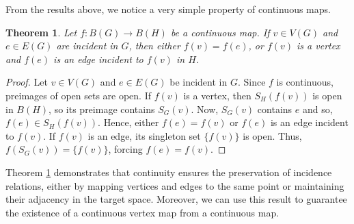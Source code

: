 \documentclass{amsart}
\newtheorem{theorem}{Theorem}[section]
\theoremstyle{definition}
\theoremstyle{remark}
\numberwithin{equation}{section}
\begin{document}
	From the results above, we notice a very simple property of continuous maps.
	
	\begin{theorem}
		\label{ContinuityPreservesIncidence}
		Let \(f:B(G) \rightarrow B(H)\) be a continuous map. If \(v \in V(G)\) and \(e \in E(G)\) are incident in \(G\), then either \(f(v) = f(e)\), or \(f(v)\) is a vertex and \(f(e)\) is an edge incident to \(f(v)\) in \(H\).
	\end{theorem}
	\begin{proof}
		Let \( v \in V(G) \) and \( e \in E(G) \) be incident in \( G \). Since \( f \) is continuous, preimages of open sets are open. If \( f(v) \) is a vertex, then \( S_H(f(v)) \) is open in \(B(H)\), so its preimage contains \(S_G(v)\). Now, \(S_G(v)\) contains \( e \) and so, \( f(e) \in S_H(f(v)) \). Hence, either \( f(e) = f(v) \) or \( f(e) \) is an edge incident to \( f(v) \). If \( f(v) \) is an edge, its singleton set \(\{f(v)\}\) is open. Thus, \(f(S_G(v)) = \{f(v)\}\), forcing \( f(e) = f(v) \).
	\end{proof}
	
	Theorem \ref{ContinuityPreservesIncidence} demonstrates that continuity ensures the preservation of incidence relations, either by mapping vertices and edges to the same point or maintaining their adjacency in the target space. Moreover, we can use this result to guarantee the existence of a continuous vertex map from a continuous map.
	
\end{document}
